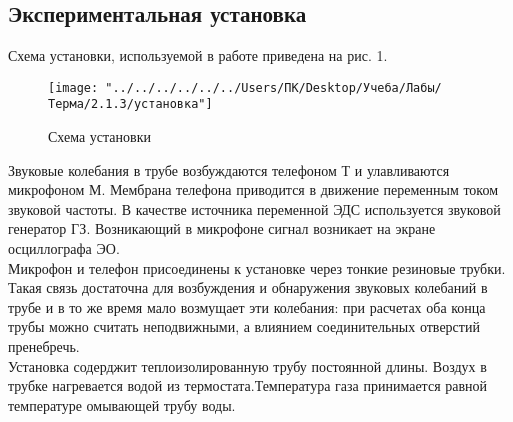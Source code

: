 \documentclass[12pt,a4paper]{article}
\begin{document}
\subsection*{Экспериментальная установка}
 Схема установки, используемой в работе приведена на рис. 1.\\
	\begin{figure}[h]
		\centering
		\texttt{[image: "../../../../../../Users/ПК/Desktop/Учеба/Лабы/Терма/2.1.3/установка"]}
		\caption{Схема установки}
	\end{figure}
Звуковые колебания в трубе возбуждаются телефоном Т и улавливаются микрофоном М. Мембрана телефона приводится в движение переменным током звуковой частоты. В качестве источника переменной ЭДС используется звуковой генератор ГЗ. Возникающий в микрофоне сигнал возникает на экране осциллографа ЭО. \\
Микрофон и телефон присоединены к установке через тонкие резиновые трубки. Такая связь достаточна для возбуждения и обнаружения звуковых колебаний в трубе и в то же время мало возмущает эти колебания: при расчетах оба конца трубы можно считать неподвижными, а влиянием соединительных отверстий пренебречь. \\
Установка содерджит теплоизолированную трубу постоянной длины. Воздух в трубке нагревается водой из термостата.Температура газа принимается равной температуре омывающей трубу воды. 
\end{document}
